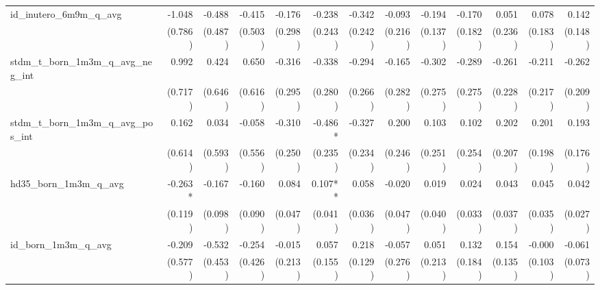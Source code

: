 \begin{tabular}{lrrrrrrrrrrrr}
id\_inutero\_6m9m\_q\_avg                   &       -1.048 &       -0.488 &       -0.415 &       -0.176 &       -0.238 &       -0.342 &       -0.093 &       -0.194 &       -0.170 &        0.051 &        0.078 &        0.142 \\ 
                                            &      (0.786) &      (0.487) &      (0.503) &      (0.298) &      (0.243) &      (0.242) &      (0.216) &      (0.137) &      (0.182) &      (0.236) &      (0.183) &      (0.148) \\ 
stdm\_t\_born\_1m3m\_q\_avg\_neg\_int       &        0.992 &        0.424 &        0.650 &       -0.316 &       -0.338 &       -0.294 &       -0.165 &       -0.302 &       -0.289 &       -0.261 &       -0.211 &       -0.262 \\ 
                                            &      (0.717) &      (0.646) &      (0.616) &      (0.295) &      (0.280) &      (0.266) &      (0.282) &      (0.275) &      (0.275) &      (0.228) &      (0.217) &      (0.209) \\ 
stdm\_t\_born\_1m3m\_q\_avg\_pos\_int       &        0.162 &        0.034 &       -0.058 &       -0.310 &      -0.486* &       -0.327 &        0.200 &        0.103 &        0.102 &        0.202 &        0.201 &        0.193 \\ 
                                            &      (0.614) &      (0.593) &      (0.556) &      (0.250) &      (0.235) &      (0.234) &      (0.246) &      (0.251) &      (0.254) &      (0.207) &      (0.198) &      (0.176) \\ 
hd35\_born\_1m3m\_q\_avg                    &      -0.263* &       -0.167 &       -0.160 &        0.084 &      0.107** &        0.058 &       -0.020 &        0.019 &        0.024 &        0.043 &        0.045 &        0.042 \\ 
                                            &      (0.119) &      (0.098) &      (0.090) &      (0.047) &      (0.041) &      (0.036) &      (0.047) &      (0.040) &      (0.033) &      (0.037) &      (0.035) &      (0.027) \\ 
id\_born\_1m3m\_q\_avg                      &       -0.209 &       -0.532 &       -0.254 &       -0.015 &        0.057 &        0.218 &       -0.057 &        0.051 &        0.132 &        0.154 &       -0.000 &       -0.061 \\ 
                                            &      (0.577) &      (0.453) &      (0.426) &      (0.213) &      (0.155) &      (0.129) &      (0.276) &      (0.213) &      (0.184) &      (0.135) &      (0.103) &      (0.073) \\ 

\end{tabular}
